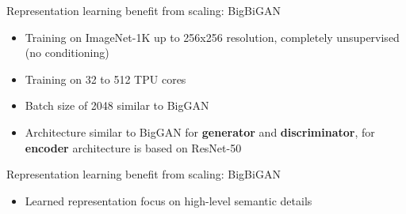 \begin{frame}{Representation learning benefit from scaling: BigBiGAN}
\protect\hypertarget{representation-learning-benefit-from-scaling-bigbigan-2}{}

\begin{itemize}
\tightlist
\item
  Training on ImageNet-1K up to 256x256 resolution, completely
  unsupervised (no conditioning)
\item
  Training on 32 to 512 TPU cores
\item
  Batch size of 2048 similar to BigGAN
\item
  Architecture similar to BigGAN for \textbf{generator} and
  \textbf{discriminator}, for \textbf{encoder} architecture is based on
  ResNet-50
\end{itemize}


\end{frame}

\begin{frame}{Representation learning benefit from scaling: BigBiGAN}
\protect\hypertarget{representation-learning-benefit-from-scaling-bigbigan-3}{}

\begin{itemize}
\tightlist
\item
  Learned representation focus on high-level semantic details
\end{itemize}



\end{frame}

